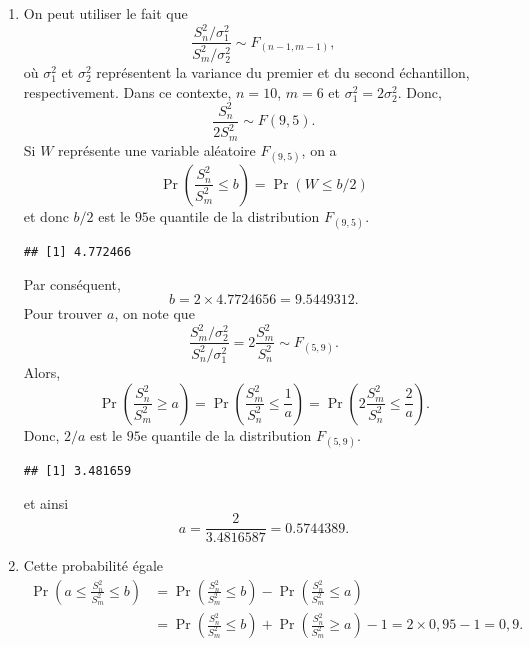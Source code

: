 \begin{solution}{2.23}
\begin{enumerate}
\item On peut utiliser le fait que
$$
\frac{S_n^2/\sigma_1^2}{S_m^2/\sigma_2^2} \sim F_{(n-1,m-1)},
$$
où $\sigma^2_1$ et $\sigma_2^2$ représentent la variance du premier et du second échantillon, respectivement. Dans ce contexte, $n=10$, $m=6$ et $\sigma_1^2 = 2\sigma_2^2$. Donc,
$$
\frac{S_n^2}{2 S_m^2} \sim F(9,5).
$$
Si $W$ représente une variable aléatoire $F_{(9,5)}$, on a
$$
\Pr\left(  \frac{S_n^2}{ S_m^2} \le b\right) = \Pr(W \le b/2)
$$
et donc $b/2$ est le $95$e quantile de la distribution $F_{(9,5)}$.
\begin{knitrout}
\color{fgcolor}\begin{kframe}
\begin{alltt}
\hlstd{(}\hlstd{,}\hlstd{=}\hlstd{,}\hlstd{=}\hlstd{)}
\end{alltt}
\begin{verbatim}
## [1] 4.772466
\end{verbatim}
\end{kframe}
\end{knitrout}
Par conséquent,
$$
b = 2 \times 4.7724656 =  9.5449312.
$$
Pour trouver $a$, on note que
$$
\frac{S_m^2/\sigma_2^2}{S_n^2/\sigma_1^2} = 2 \frac{S_m^2}{ S_n^2} \sim F_{(5,9)}.
$$
Alors,
$$
\Pr\left(  \frac{S_n^2}{ S_m^2} \ge a\right) = \Pr\left(  \frac{S_m^2}{ S_n^2} \le \frac{1}{a}\right) = \Pr\left(  2\frac{S_m^2}{ S_n^2} \le \frac{2}{a}\right).
$$
Donc, $2/a$ est le $95$e quantile de la distribution $F_{(5,9)}$.
\begin{knitrout}
\color{fgcolor}\begin{kframe}
\begin{alltt}
\hlstd{(}\hlstd{,}\hlstd{=}\hlstd{,}\hlstd{=}\hlstd{)}
\end{alltt}
\begin{verbatim}
## [1] 3.481659
\end{verbatim}
\end{kframe}
\end{knitrout}
et ainsi
$$
a = \frac{2}{3.4816587} = 0.5744389.
$$
\item Cette probabilité égale
\begin{align*}
\Pr\left(a \le \frac{S_n^2}{S_m^2}\le b\right) & = \Pr\left(\frac{S_n^2}{S_m^2}\le b\right) - \Pr\left(\frac{S_n^2}{S_m^2}\le a\right)\\
& = \Pr\left(\frac{S_n^2}{S_m^2}\le b\right) + \Pr\left(\frac{S_n^2}{S_m^2}\ge a\right) -1 = 2\times 0,95 -1 = 0,9.
\end{align*}
\end{enumerate}
\end{solution}
